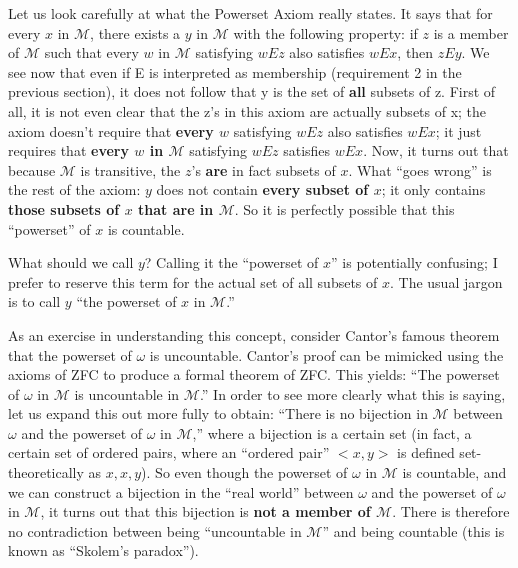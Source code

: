 \documentclass[10pt]{article}
\newcommand\axiom[1]{\textmd{#1}}
\begin{document}
Let us look carefully at what the Powerset Axiom really states. It says that for every $x$ in $\mathcal M$, there exists a $y$ in $\mathcal{M}$ with the following property: if $z$ is a member of $\mathcal{M}$ such that every $w$ in $\mathcal{M}$ satisfying $w E z$ also satisfies $w E x$, then $z E y$. We see now that even if E is interpreted as membership (requirement 2 in the previous section), it does not follow that y is the set of \textbf{all} subsets of z. First of all, it is not even clear that the z's in this axiom are actually subsets of x; the axiom doesn't require that \textbf{every $w$} satisfying $w E z$ also satisfies $w E x$; it just requires that \textbf{every $w$ in $\mathcal M$} satisfying $w E z$ satisfies $w E x$. Now, it turns out that because $\mathcal{M}$ is transitive, the $z$'s \textbf{are} in fact subsets of $x$. What ``goes wrong'' is the rest of the axiom: $y$ does not contain \textbf{every subset of $x$}; it only contains \textbf{those subsets of $x$ that are in $\mathcal M$}. So it is perfectly possible that this ``powerset'' of $x$ is countable.

What should we call $y$? Calling it the ``powerset of $x$'' is potentially confusing; I prefer to reserve this term for the actual set of all subsets of $x$. The usual jargon is to call $y$ ``the powerset of $x$ in $\mathcal M$.''

As an exercise in understanding this concept, consider Cantor's famous theorem that the powerset of $\omega$ is uncountable. Cantor's proof can be mimicked using the axioms of \axiom{ZFC} to produce a formal theorem of \axiom{ZFC}. This yields: ``The powerset of $\omega$ in $\mathcal{M}$ is uncountable in $\mathcal M$.'' In order to see more clearly what this is saying, let us expand this out more fully to obtain: ``There is no bijection in $\mathcal{M}$ between $\omega$ and the powerset of $\omega$ in $\mathcal M$,'' where a bijection is a certain set (in fact, a certain set of ordered pairs, where an ``ordered pair'' $<x,y>$ is defined set-theoretically as ${{x}, {x,y}}$). So even though the powerset of $\omega$ in $\mathcal{M}$ is countable, and we can construct a bijection in the ``real world'' between $\omega$ and the powerset of $\omega$ in $\mathcal M$, it turns out that this bijection is \textbf{not a member of $\mathcal M$}. There is therefore no contradiction between being ``uncountable in $\mathcal M$'' and being countable (this is known as ``Skolem's paradox'').
\end{document}
